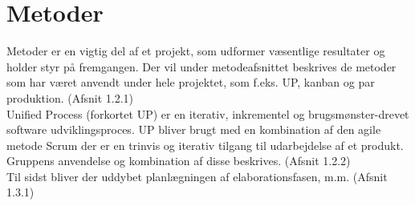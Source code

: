 \chapter{Metoder}
Metoder er en vigtig del af et projekt, som udformer væsentlige resultater og holder styr på fremgangen. Der vil under metodeafsnittet beskrives de metoder som har været anvendt under hele projektet, som f.eks. UP, kanban og par produktion. (Afsnit 1.2.1) \\
Unified Process (forkortet UP) er en iterativ, inkrementel og brugsmønster-drevet software udviklingsproces. UP bliver brugt med en kombination af den agile metode Scrum der er en trinvis og iterativ tilgang til udarbejdelse af et produkt. Gruppens anvendelse og kombination af disse beskrives. (Afsnit 1.2.2) \\
Til sidst bliver der uddybet planlægningen af elaborationsfasen, m.m. (Afsnit 1.3.1)

